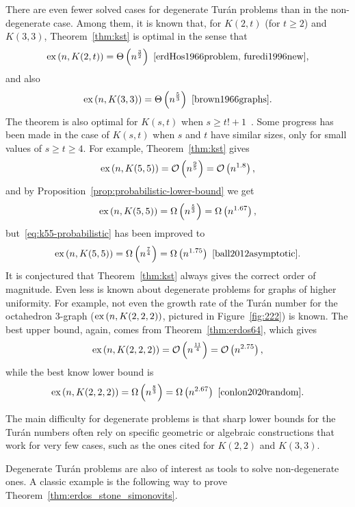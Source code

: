 There are even fewer solved cases for degenerate Turán problems than in the non-degenerate case.
Among them, it is known that, for $K(2, t)$ (for $t \geq 2$) and $K(3, 3)$,
Theorem~\ref{thm:kst} is optimal in the sense that
\[
    \text{ex} \left( n, K(2, t) \right) = \Theta\left(n^{\frac{3}{2}}\right)~\cite{erdHos1966problem, furedi1996new},
\]
and also
\[
    \text{ex} \left( n, K(3, 3) \right) = \Theta\left(n^{\frac{5}{3}}\right)~\cite{brown1966graphs}.
\]
The theorem is also optimal for $K(s, t)$ when $s \geq t! + 1$~\cite{kollar1996norm}.
Some progress has been made in the case of $K(s, t)$ when $s$ and $t$ have similar sizes,
only for small values of $s \geq t \geq 4$.
For example, Theorem~\ref{thm:kst} gives
\[
    \text{ex} \left( n, K(5,5) \right) = \mathcal{O}\left(n^{\frac{9}{5}}\right) = \mathcal{O}\left(n^{1.8}\right),
\]
and by Proposition~\ref{prop:probabilistic-lower-bound} we get
\begin{equation} \label{eq:k55-probabilistic}
    \text{ex} \left( n, K(5,5) \right) = \Omega\left(n^{\frac{5}{3}}\right) = \Omega\left(n^{1.67}\right),
\end{equation}
but~\eqref{eq:k55-probabilistic} has been improved to
\[
    \text{ex} \left( n, K(5,5) \right) = \Omega\left(n^{\frac{7}{4}}\right) = \Omega\left(n^{1.75}\right)~\cite{ball2012asymptotic}.
\]
It is conjectured that Theorem~\ref{thm:kst} always gives the correct order of magnitude.
Even less is known about degenerate problems for graphs of higher uniformity.
For example, not even the growth rate of the Turán number for the octahedron 3-graph
($\text{ex} \left( n, K(2, 2, 2) \right)$, pictured in Figure~\ref{fig:222}) is known.
The best upper bound, again, comes from Theorem~\ref{thm:erdos64}, which gives
\[
    \text{ex} \left( n, K(2, 2, 2) \right) = \mathcal{O}\left(n^{\frac{11}{4}}\right) = \mathcal{O}\left(n^{2.75}\right),
\]
while the best know lower bound is
\[
    \text{ex} \left( n, K(2, 2, 2) \right) = \Omega\left(n^{\frac{8}{3}}\right) = \Omega\left(n^{2.67}\right)~\cite{conlon2020random}.
\]

The main difficulty for degenerate problems is that sharp lower bounds for the Turán numbers
often rely on specific geometric or algebraic constructions that work for very few cases,
such as the ones cited for $K(2, 2)$ and $K(3, 3)$.

Degenerate Turán problems are also of interest as tools to solve non-degenerate ones.
A classic example is the following way to prove Theorem~\ref{thm:erdos_stone_simonovits}.

